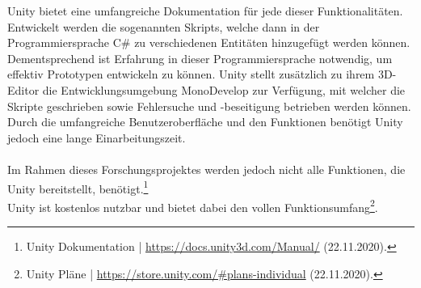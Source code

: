 \documentclass[a4paper,12pt,oneside]{article}
\begin{document}
        Unity bietet eine umfangreiche Dokumentation für jede dieser Funktionalitäten.
        Entwickelt werden die sogenannten Skripts, welche dann in der Programmiersprache
        C\# zu verschiedenen Entitäten hinzugefügt werden können. Dementsprechend ist
        Erfahrung in dieser Programmiersprache notwendig, um effektiv Prototypen
        entwickeln zu können. 
        Unity stellt zusätzlich zu ihrem 3D-Editor die 
        Entwicklungsumgebung MonoDevelop zur Verfügung, mit welcher die Skripte 
        geschrieben sowie Fehlersuche und -beseitigung betrieben werden können.
        Durch die umfangreiche Benutzeroberfläche und den Funktionen benötigt Unity jedoch 
        eine lange Einarbeitungszeit. \\ \\
        Im Rahmen dieses Forschungsprojektes werden jedoch nicht alle Funktionen,
        die Unity bereitstellt, benötigt.\footnote{Unity Dokumentation | \url{https://docs.unity3d.com/Manual/} (22.11.2020).} \\
        Unity ist kostenlos nutzbar und bietet dabei den vollen Funktionsumfang\footnote{Unity Pläne | \url{https://store.unity.com/\#plans-individual} (22.11.2020).}.
\end{document}
